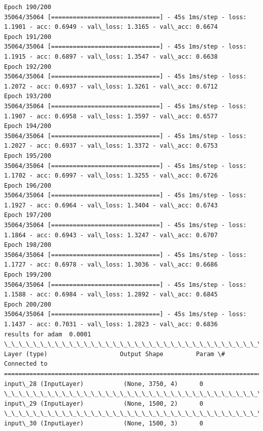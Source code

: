 \documentclass[11pt]{article}
\begin{document}
\begin{Verbatim}[commandchars=\\\{\}]
Epoch 190/200
35064/35064 [==============================] - 45s 1ms/step - loss: 1.1901 - acc: 0.6949 - val\_loss: 1.3165 - val\_acc: 0.6674
Epoch 191/200
35064/35064 [==============================] - 45s 1ms/step - loss: 1.1915 - acc: 0.6897 - val\_loss: 1.3547 - val\_acc: 0.6638
Epoch 192/200
35064/35064 [==============================] - 45s 1ms/step - loss: 1.2072 - acc: 0.6937 - val\_loss: 1.3261 - val\_acc: 0.6712
Epoch 193/200
35064/35064 [==============================] - 45s 1ms/step - loss: 1.1907 - acc: 0.6958 - val\_loss: 1.3597 - val\_acc: 0.6577
Epoch 194/200
35064/35064 [==============================] - 45s 1ms/step - loss: 1.2027 - acc: 0.6937 - val\_loss: 1.3372 - val\_acc: 0.6753
Epoch 195/200
35064/35064 [==============================] - 45s 1ms/step - loss: 1.1702 - acc: 0.6997 - val\_loss: 1.3255 - val\_acc: 0.6726
Epoch 196/200
35064/35064 [==============================] - 45s 1ms/step - loss: 1.1927 - acc: 0.6964 - val\_loss: 1.3404 - val\_acc: 0.6743
Epoch 197/200
35064/35064 [==============================] - 45s 1ms/step - loss: 1.1864 - acc: 0.6943 - val\_loss: 1.3247 - val\_acc: 0.6707
Epoch 198/200
35064/35064 [==============================] - 45s 1ms/step - loss: 1.1727 - acc: 0.6978 - val\_loss: 1.3036 - val\_acc: 0.6686
Epoch 199/200
35064/35064 [==============================] - 45s 1ms/step - loss: 1.1588 - acc: 0.6984 - val\_loss: 1.2892 - val\_acc: 0.6845
Epoch 200/200
35064/35064 [==============================] - 45s 1ms/step - loss: 1.1437 - acc: 0.7031 - val\_loss: 1.2823 - val\_acc: 0.6836
results for adam  0.0001
\_\_\_\_\_\_\_\_\_\_\_\_\_\_\_\_\_\_\_\_\_\_\_\_\_\_\_\_\_\_\_\_\_\_\_\_\_\_\_\_\_\_\_\_\_\_\_\_\_\_\_\_\_\_\_\_\_\_\_\_\_\_\_\_\_\_\_\_\_\_\_\_\_\_\_\_\_\_\_\_\_\_\_\_\_\_\_\_\_\_\_\_\_\_\_\_\_\_
Layer (type)                    Output Shape         Param \#     Connected to                     
==================================================================================================
input\_28 (InputLayer)           (None, 3750, 4)      0                                            
\_\_\_\_\_\_\_\_\_\_\_\_\_\_\_\_\_\_\_\_\_\_\_\_\_\_\_\_\_\_\_\_\_\_\_\_\_\_\_\_\_\_\_\_\_\_\_\_\_\_\_\_\_\_\_\_\_\_\_\_\_\_\_\_\_\_\_\_\_\_\_\_\_\_\_\_\_\_\_\_\_\_\_\_\_\_\_\_\_\_\_\_\_\_\_\_\_\_
input\_29 (InputLayer)           (None, 1500, 2)      0                                            
\_\_\_\_\_\_\_\_\_\_\_\_\_\_\_\_\_\_\_\_\_\_\_\_\_\_\_\_\_\_\_\_\_\_\_\_\_\_\_\_\_\_\_\_\_\_\_\_\_\_\_\_\_\_\_\_\_\_\_\_\_\_\_\_\_\_\_\_\_\_\_\_\_\_\_\_\_\_\_\_\_\_\_\_\_\_\_\_\_\_\_\_\_\_\_\_\_\_
input\_30 (InputLayer)           (None, 1500, 3)      0                                            

\end{Verbatim}
\end{document}
